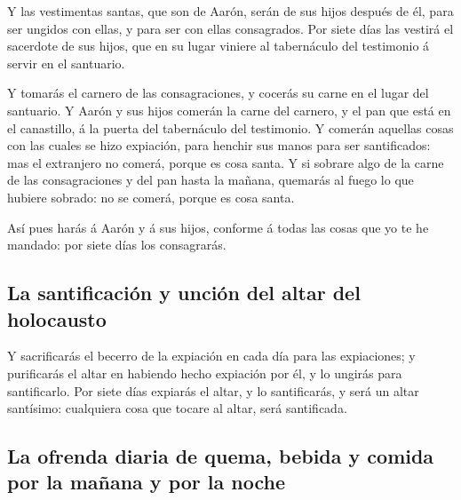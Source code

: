  Y las vestimentas santas, que son de Aarón, serán de sus
hijos después de él, para ser ungidos con ellas, y para ser con ellas
consagrados.  Por siete días las vestirá el sacerdote de
sus hijos, que en su lugar viniere al tabernáculo del testimonio á
servir en el santuario.

 Y tomarás el carnero de las consagraciones, y cocerás su
carne en el lugar del santuario.  Y Aarón y sus hijos
comerán la carne del carnero, y el pan que está en el canastillo, á la
puerta del tabernáculo del testimonio.  Y comerán aquellas
cosas con las cuales se hizo expiación, para henchir sus manos para ser
santificados: mas el extranjero no comerá, porque es cosa santa.
 Y si sobrare algo de la carne de las consagraciones y del
pan hasta la mañana, quemarás al fuego lo que hubiere sobrado: no se
comerá, porque es cosa santa.

 Así pues harás á Aarón y á sus hijos, conforme á todas las
cosas que yo te he mandado: por siete días los consagrarás.

\hypertarget{la-santificaciuxf3n-y-unciuxf3n-del-altar-del-holocausto}{%
\subsection{La santificación y unción del altar del
holocausto}\label{la-santificaciuxf3n-y-unciuxf3n-del-altar-del-holocausto}}

 Y sacrificarás el becerro de la expiación en cada día para
las expiaciones; y purificarás el altar en habiendo hecho expiación por
él, y lo ungirás para santificarlo.  Por siete días
expiarás el altar, y lo santificarás, y será un altar santísimo:
cualquiera cosa que tocare al altar, será santificada.

\hypertarget{la-ofrenda-diaria-de-quema-bebida-y-comida-por-la-mauxf1ana-y-por-la-noche}{%
\subsection{La ofrenda diaria de quema, bebida y comida por la mañana y
por la
noche}\label{la-ofrenda-diaria-de-quema-bebida-y-comida-por-la-mauxf1ana-y-por-la-noche}}

